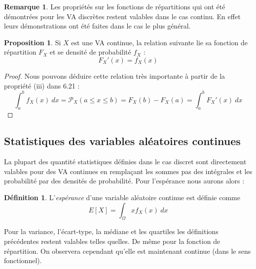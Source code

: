 \documentclass[a4paper,12pt]{report}
\theoremstyle{definition}
\renewcommand{\(}{\left(}
\renewcommand{\)}{\right)}
\renewcommand{\P}{\mathcal{P}}
\renewcommand{\d}{\textit}
\newtheorem{defn}[thm]{Définition}
\newtheorem{rmk}[thm]{Remarque}
\newtheorem{prop}[thm]{Proposition}
\begin{document}
        \begin{rmk}
            Les propriétés sur les fonctions de répartitions qui ont été démontrées pour les VA discrètes restent valables dans le cas continu. En effet leurs démonstrations ont été faites dans le cas le plus général. 
        \end{rmk}
        
        \begin{leftbar}
        \begin{prop}
            Si $X$ est une VA continue, la relation suivante lie sa fonction de répartition $F_X$ et se densité de probabilité $f_X$ :
            $$F_X'(x) = f_X(x)$$
        \end{prop}
        \end{leftbar}
        
        \begin{proof}
        Nous pouvons déduire cette relation très importante à partir de la propriété (iii) dans 6.21 :
        $$\int_a^bf_X(x)~dx = \P_X(a\leq x\leq b) = F_X(b)-F_X(a) = \int_a^b F_X'(x)~dx$$
        \end{proof}
        
        \subsection{Statistiques des variables aléatoires continues}
        
            La plupart des quantité statistiques définies dans le cas discret sont directement valables pour des VA continues en remplaçant les sommes pas des intégrales et les probabilité par des densités de probabilité. Pour l'espérance nous aurons alors :
            
            \begin{leftbar}
                \begin{defn}
                    L'\d{espérance} d'une variable aléatoire continue est définie comme
                    $$E[X] = \int_\Omega xf_X(x)~dx $$
                \end{defn}
            \end{leftbar}
            
            Pour la variance, l'écart-type, la médiane et les quartiles les définitions précédentes restent valables telles quelles. De même pour la fonction de répartition. On observera cependant qu'elle est maintenant continue (dans le sens fonctionnel).
            
\end{document}

